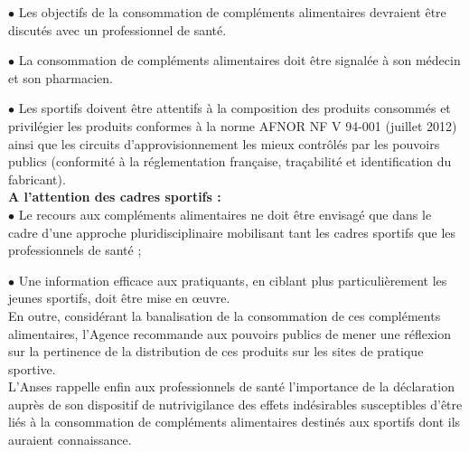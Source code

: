 \documentclass[8pt]{article}
\begin{document}
	$\bullet$ Les objectifs de la consommation de compléments alimentaires devraient être discutés avec un professionnel de santé.
	
	$\bullet$ La consommation de compléments alimentaires doit être signalée à son médecin et son pharmacien.
	
	$\bullet$ Les sportifs doivent être attentifs à la composition des produits consommés et privilégier les produits conformes à la norme AFNOR NF V 94-001 (juillet 2012) ainsi que les circuits d’approvisionnement les mieux contrôlés par les pouvoirs publics (conformité à la réglementation française, traçabilité et identification du fabricant).\\


\textbf{A l’attention des cadres sportifs :}\\

	$\bullet$ Le recours aux compléments alimentaires ne doit être envisagé que dans le cadre d’une approche pluridisciplinaire mobilisant tant les cadres sportifs que les professionnels de santé ;
	
	$\bullet$ Une information efficace aux pratiquants, en ciblant plus particulièrement les jeunes sportifs, doit être mise en œuvre.\\

En outre, considérant la banalisation de la consommation de ces compléments alimentaires, l’Agence recommande aux pouvoirs publics de mener une réflexion sur la pertinence de la distribution de ces produits sur les sites de pratique sportive.\\

L’Anses rappelle enfin aux professionnels de santé l’importance de la déclaration auprès de son dispositif de nutrivigilance des effets indésirables susceptibles d’être liés à la consommation de compléments alimentaires destinés aux sportifs dont ils auraient connaissance.
\end{document}
